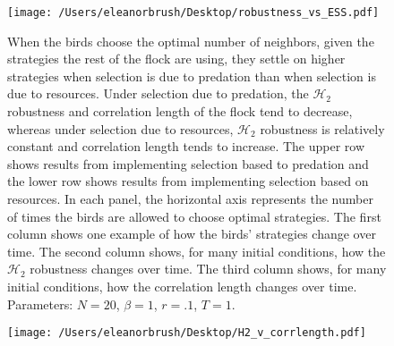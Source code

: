 \documentclass{article}
\begin{document}
\begin{figure}
\texttt{[image: /Users/eleanorbrush/Desktop/robustness\_vs\_ESS.pdf]}
\caption{\label{ESS_v_H2}
}
\end{figure}

\begin{figure}
\caption{\label{greedyopt} When the birds choose the optimal number of neighbors, given the strategies the rest of the flock are using, they settle on higher strategies when selection is due to predation than when selection is due to resources. Under selection due to predation, the $\mathscr{H}_2$ robustness and correlation length of the flock tend to decrease, whereas under selection due to resources, $\mathscr{H}_2$ robustness is relatively constant and correlation length tends to increase. The upper row shows results from implementing selection based to predation and the lower row shows results from implementing selection based on resources. In each panel, the  horizontal axis represents the number of times the birds are allowed to choose optimal strategies. The first column shows one example of how the birds' strategies change over time. The second column shows, for many initial conditions, how the $\mathscr{H}_2$ robustness changes over time. The third column shows, for many initial conditions, how the correlation length changes over time. Parameters:  $N=20$, $\beta=1$, $r=.1$, $T=1$. 
}
\end{figure}

\begin{figure}
\texttt{[image: /Users/eleanorbrush/Desktop/H2\_v\_corrlength.pdf]}
\caption{\label{compare_props} }
\end{figure}



\nocite{*}


\end{document}
